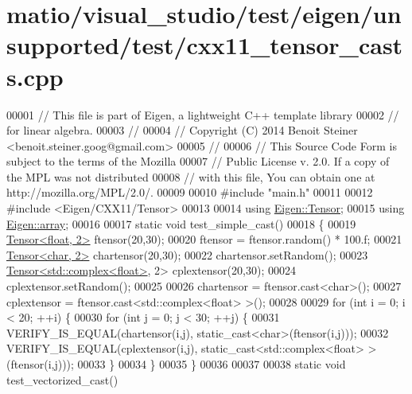 \hypertarget{matio_2visual__studio_2test_2eigen_2unsupported_2test_2cxx11__tensor__casts_8cpp_source}{}\section{matio/visual\+\_\+studio/test/eigen/unsupported/test/cxx11\+\_\+tensor\+\_\+casts.cpp}
\label{matio_2visual__studio_2test_2eigen_2unsupported_2test_2cxx11__tensor__casts_8cpp_source}

\begin{DoxyCode}
00001 \textcolor{comment}{// This file is part of Eigen, a lightweight C++ template library}
00002 \textcolor{comment}{// for linear algebra.}
00003 \textcolor{comment}{//}
00004 \textcolor{comment}{// Copyright (C) 2014 Benoit Steiner <benoit.steiner.goog@gmail.com>}
00005 \textcolor{comment}{//}
00006 \textcolor{comment}{// This Source Code Form is subject to the terms of the Mozilla}
00007 \textcolor{comment}{// Public License v. 2.0. If a copy of the MPL was not distributed}
00008 \textcolor{comment}{// with this file, You can obtain one at http://mozilla.org/MPL/2.0/.}
00009 
00010 \textcolor{preprocessor}{#include "main.h"}
00011 
00012 \textcolor{preprocessor}{#include <Eigen/CXX11/Tensor>}
00013 
00014 \textcolor{keyword}{using} \hyperlink{class_eigen_1_1_tensor}{Eigen::Tensor};
00015 \textcolor{keyword}{using} \hyperlink{class_eigen_1_1array}{Eigen::array};
00016 
00017 \textcolor{keyword}{static} \textcolor{keywordtype}{void} test\_simple\_cast()
00018 \{
00019   \hyperlink{class_eigen_1_1_tensor}{Tensor<float, 2>} ftensor(20,30);
00020   ftensor = ftensor.random() * 100.f;
00021   \hyperlink{class_eigen_1_1_tensor}{Tensor<char, 2>} chartensor(20,30);
00022   chartensor.setRandom();
00023   \hyperlink{class_eigen_1_1_tensor}{Tensor<std::complex<float>}, 2> cplextensor(20,30);
00024   cplextensor.setRandom();
00025 
00026   chartensor = ftensor.cast<\textcolor{keywordtype}{char}>();
00027   cplextensor = ftensor.cast<std::complex<float> >();
00028 
00029   \textcolor{keywordflow}{for} (\textcolor{keywordtype}{int} i = 0; i < 20; ++i) \{
00030     \textcolor{keywordflow}{for} (\textcolor{keywordtype}{int} j = 0; j < 30; ++j) \{
00031       VERIFY\_IS\_EQUAL(chartensor(i,j), static\_cast<char>(ftensor(i,j)));
00032       VERIFY\_IS\_EQUAL(cplextensor(i,j), \textcolor{keyword}{static\_cast<}std::complex<float> \textcolor{keyword}{>}(ftensor(i,j)));
00033     \}
00034   \}
00035 \}
00036 
00037 
00038 \textcolor{keyword}{static} \textcolor{keywordtype}{void} test\_vectorized\_cast()

\end{DoxyCode}
